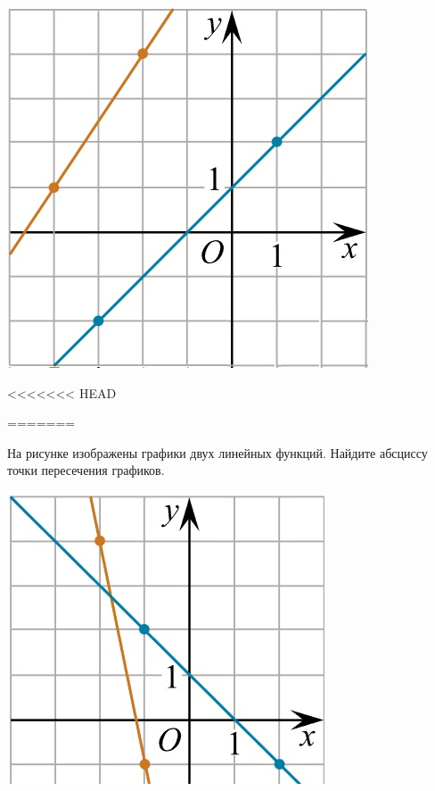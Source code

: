 \begin{homework}[number=2]
\begin{listofex}
\begin{minipage}[c]{0.25\textwidth}
			\includegraphics[width=\textwidth]{pics/G101M4H2-2.jpg}
		\end{minipage}
<<<<<<< HEAD
		\item 
=======
		\item
		\begin{minipage}[t]{0.7\textwidth}
			На рисунке изображены графики двух линейных функций. Найдите абсциссу точки пересечения графиков.
		\end{minipage}
		\begin{minipage}[c]{0.26\textwidth}
			\includegraphics[align=t, width=\textwidth]{pics/G101M4H2-3.jpg}

\end{minipage}
\end{listofex}
\end{homework}
